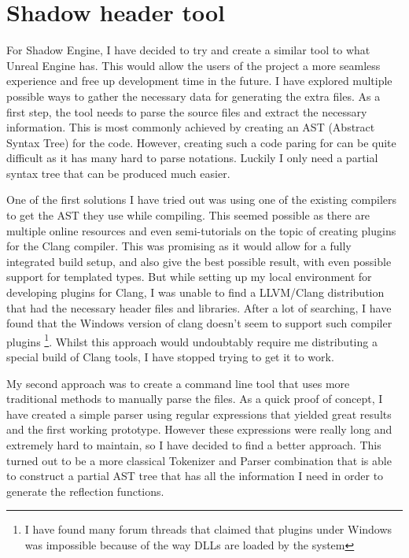 \section{Shadow header tool}\label{sec:shadow-header-tool}

For Shadow Engine, I have decided to try and create a similar tool to what Unreal Engine has.
This would allow the users of the project a more seamless experience and free up development time in the future.
I have explored multiple possible ways to gather the necessary data for generating the extra files. As a first step, the tool needs to parse the \Cpp source files and extract the necessary information. This is most commonly achieved by creating an AST (Abstract Syntax Tree) for the code. However, creating such a code paring for \Cpp can be quite difficult as it has many hard to parse notations. Luckily I only need a partial syntax tree that can be produced much easier.

One of the first solutions I have tried out was using one of the existing compilers to get the AST they use while compiling.
This seemed possible as there are multiple online resources and even semi-tutorials on the topic \cite{jdh-reflection-compiler-plugin} \cite{cppcon-compiler-plugins} of creating plugins for the Clang compiler.
This was promising as it would allow for a fully integrated build setup, and also give the best possible result, with even possible support for templated types.
But while setting up my local environment for developing plugins for Clang, I was unable to find a LLVM/Clang distribution that had the necessary header files and libraries. After a lot of searching, I have found that the Windows version of clang doesn't seem to support such compiler plugins \footnote{I have found many forum threads that claimed that plugins under Windows was impossible because of the way DLLs are loaded by the system}. Whilst this approach would undoubtably require me distributing a special build of Clang tools, I have stopped trying to get it to work.

My second approach was to create a \Csh command line tool that uses more traditional methods to manually parse the \Cpp files. As a quick proof of concept, I have created a simple parser using regular expressions that yielded great results and the first working prototype. However these expressions were really long and extremely hard to maintain, so I have decided to find a better approach. This turned out to be a more classical Tokenizer and Parser combination that is able to construct a partial AST tree that has all the information I need in order to generate the reflection functions.

